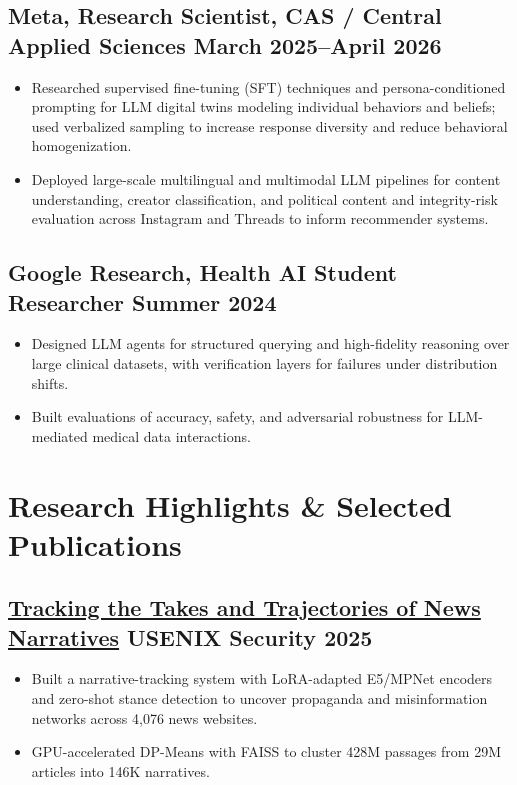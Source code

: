 \documentclass[a4,10pt]{article}
\newenvironment{zitemize}{
  \begin{itemize}\itemsep0pt\parskip0pt\parsep1pt}
  {\end{itemize}\vspace{-0.4cm}}
\begin{document}
\subsection*{Meta, Research Scientist, CAS / Central Applied Sciences \hfill March 2025--April 2026}
\begin{zitemize}
\item Researched supervised fine-tuning (SFT) techniques and persona-conditioned prompting for LLM digital twins modeling individual behaviors and beliefs; used verbalized sampling to increase response diversity and reduce behavioral homogenization.
\item Deployed large-scale multilingual and multimodal LLM pipelines for content understanding, creator classification, and political content and integrity-risk evaluation across Instagram and Threads to inform recommender systems.
\end{zitemize}

\vspace{0.25em}
\subsection*{Google Research, Health AI Student Researcher \hfill Summer 2024}
\begin{zitemize}
\item Designed LLM agents for structured querying and high-fidelity reasoning over large clinical datasets, with verification layers for failures under distribution shifts.
\item Built evaluations of accuracy, safety, and adversarial robustness for LLM-mediated medical data interactions.
\end{zitemize}

\vspace{-1em}
\section{Research Highlights \& Selected Publications}
\vspace{-0.5em}

\subsection*{\href{https://www.usenix.org/system/files/conference/usenixsecurity25/sec25cycle1-prepub-487-hanley.pdf}{Tracking the Takes and Trajectories of News Narratives} \hfill USENIX Security 2025}
\begin{zitemize}
\item Built a narrative-tracking system with LoRA-adapted E5/MPNet encoders and zero-shot stance detection to uncover propaganda and misinformation networks across 4,076 news websites.
\item GPU-accelerated DP-Means with FAISS to cluster 428M passages from 29M articles into 146K narratives.
\end{zitemize}
\end{document}
